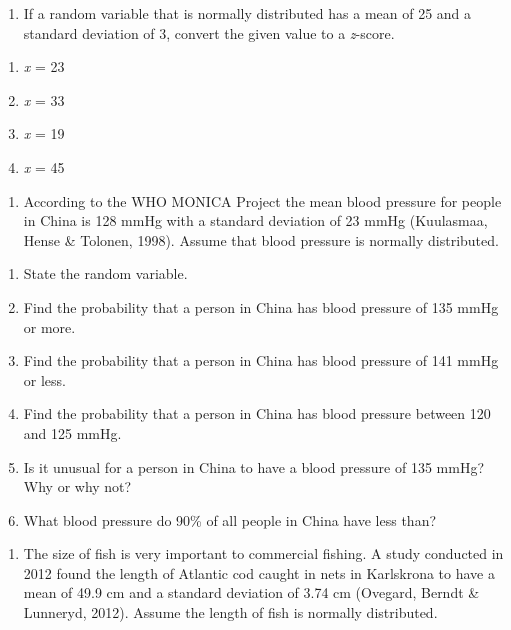\documentclass[
]{book}
\providecommand{\tightlist}{%
  \setlength{\itemsep}{0pt}\setlength{\parskip}{0pt}}
\begin{document}
\begin{enumerate}
\def\labelenumi{\arabic{enumi}.}
\setcounter{enumi}{2}
\tightlist
\item
  If a random variable that is normally distributed has a mean of 25 and a standard deviation of 3, convert the given value to a \emph{z}-score.
\end{enumerate}

\begin{enumerate}
\def\labelenumi{\alph{enumi}.}
\tightlist
\item
  \emph{x} = 23
\item
  \emph{x} = 33
\item
  \emph{x} = 19
\item
  \emph{x} = 45
\end{enumerate}

\begin{enumerate}
\def\labelenumi{\arabic{enumi}.}
\setcounter{enumi}{3}
\tightlist
\item
  According to the WHO MONICA Project the mean blood pressure for people in China is 128 mmHg with a standard deviation of 23 mmHg (Kuulasmaa, Hense \& Tolonen, 1998). Assume that blood pressure is normally distributed.
\end{enumerate}

\begin{enumerate}
\def\labelenumi{\alph{enumi}.}
\tightlist
\item
  State the random variable.
\item
  Find the probability that a person in China has blood pressure of 135 mmHg or more.
\item
  Find the probability that a person in China has blood pressure of 141 mmHg or less.
\item
  Find the probability that a person in China has blood pressure between 120 and 125 mmHg.
\item
  Is it unusual for a person in China to have a blood pressure of 135 mmHg? Why or why not?
\item
  What blood pressure do 90\% of all people in China have less than?
\end{enumerate}

\begin{enumerate}
\def\labelenumi{\arabic{enumi}.}
\setcounter{enumi}{4}
\tightlist
\item
  The size of fish is very important to commercial fishing. A study conducted in 2012 found the length of Atlantic cod caught in nets in Karlskrona to have a mean of 49.9 cm and a standard deviation of 3.74 cm (Ovegard, Berndt \& Lunneryd, 2012). Assume the length of fish is normally distributed.
\end{enumerate}
\end{document}
